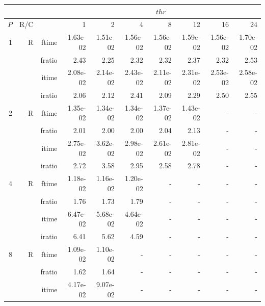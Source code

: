 \documentclass[a4paper]{article}
\begin{document}
\begin{table}[htbp]
\begin{center}
\begin{small}
\begin{tabular}{|r|r|r|r|r|r|r|r|r|r|}
\hline 
     & & & \multicolumn{7}{c|}{$thr$} \\ \hline
    $P$ & R/C &  & 1           & 2    & 4    & 8    & 12   & 16    & 24  \\ \hline\hline
     1 & R & ftime & 1.63e-02 & 1.51e-02 & 1.56e-02 & 1.56e-02 & 1.59e-02 & 1.56e-02 & 1.70e-02 \\   
          &      & fratio & 2.43 & 2.25 & 2.32 & 2.32 & 2.37 & 2.32 & 2.53 \\   
          &      & itime & 2.08e-02 & 2.14e-02 & 2.43e-02 & 2.11e-02 & 2.31e-02 & 2.53e-02 & 2.58e-02 \\   
          &      & iratio & 2.06 & 2.12 & 2.41 & 2.09 & 2.29 & 2.50 & 2.55 \\ \hline 
     2 & R & ftime & 1.35e-02 & 1.34e-02 & 1.34e-02 & 1.37e-02 & 1.43e-02 &     -     &     -     \\   
          &      & fratio & 2.01 & 2.00 & 2.00 & 2.04 & 2.13 &     -     &     -     \\   
          &      & itime & 2.75e-02 & 3.62e-02 & 2.98e-02 & 2.61e-02 & 2.81e-02 &     -     &     -     \\   
          &      & iratio & 2.72 & 3.58 & 2.95 & 2.58 & 2.78 &     -     &     -     \\ \hline 
     4 & R & ftime & 1.18e-02 & 1.16e-02 & 1.20e-02 &     -     &     -     &     -     &     -     \\   
          &      & fratio & 1.76 & 1.73 & 1.79 &     -     &     -     &     -     &     -     \\   
          &      & itime & 6.47e-02 & 5.68e-02 & 4.64e-02 &     -     &     -     &     -     &     -     \\   
          &      & iratio & 6.41 & 5.62 & 4.59 &     -     &     -     &     -     &     -     \\ \hline 
     8 & R & ftime & 1.09e-02 & 1.10e-02 &     -     &     -     &     -     &     -     &     -     \\   
          &      & fratio & 1.62 & 1.64 &     -     &     -     &     -     &     -     &     -     \\   
          &      & itime & 4.17e-02 & 9.07e-02 &     -     &     -     &     -     &     -     &     -     \\   

\end{tabular}
\end{small}
\end{center}
\end{table}
\end{document}
